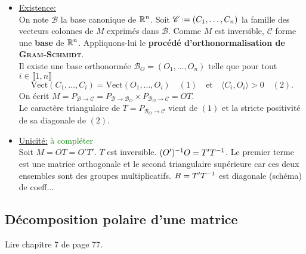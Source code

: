 \begin{preuve}
    \begin{itemize}
        \item \underline{Existence:} \\
        On note $\mathscr{B}$ la base canonique de $\mathbb{R}^n$. Soit $\mathscr{C} \defeq (C_1, \dots, C_n)$ la famille des vecteurs colonnes de $M$ exprimés dans $\mathscr{B}$. Comme $M$ est inversible, $\mathscr{C}$ forme une \textbf{base} de $\mathbb{R}^n$. Appliquons-lui le \textbf{procédé d'orthonormalisation de \textsc{Gram}-\textsc{Schmidt}}. \\
        Il existe une base orthonormée $\mathscr{B}_O = (O_1, \dots, O_n)$ telle que pour tout $i \in \llbracket 1, n \rrbracket$
        $$\mathrm{Vect}(C_1, \dots, C_i) = \mathrm{Vect}(O_1,\dots, O_i) \quad (1) \quad \text{et} \quad \langle C_i, O_i \rangle > 0 \quad (2).$$
        On écrit $M = P_{\mathscr{B} \to \mathscr{C}} = P_{\mathscr{B} \to \mathscr{B}_O} \times P_{\mathscr{B}_O \to \mathscr{C}} = OT$. \\
        Le caractère triangulaire de $T = P_{\mathscr{B}_O \to \mathscr{C}}$ vient de $(1)$ et la stricte positivité de sa diagonale de $(2)$.
        \item \underline{Unicité:} \textcolor{green}{à compléter} \\
        Soit $M = OT = O'T'$. $T$ est inversible. $(O')^{-1}O =T'T^{-1}$. Le premier terme est une matrice orthogonale et le second triangulaire supérieure car ces deux ensembles sont des groupes multiplicatifs. $B = T'T^{-1}$ est diagonale (schéma) de coeff...
    \end{itemize} 
\end{preuve}

\subsection{Décomposition polaire d'une matrice}
Lire chapitre 7 de \cite{matrices} page 77.